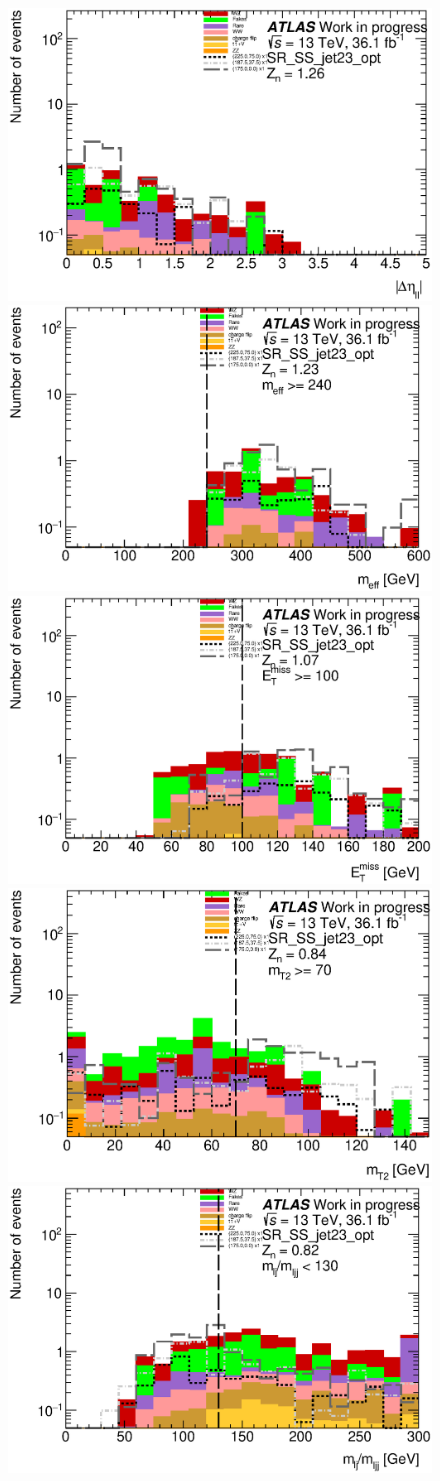 \begin{figure}[htpb]
\centering
\includegraphics[width=0.45\linewidth]{data/plot/plot_SR/dEta_SR_SS_jet23_opt_0}
\includegraphics[width=0.45\linewidth]{data/plot/plot_SR/meff_SR_SS_jet23_opt_0}\\
\includegraphics[width=0.45\linewidth]{data/plot/plot_SR/MET_SR_SS_jet23_opt_0}
\includegraphics[width=0.45\linewidth]{data/plot/plot_SR/mTtwo_SR_SS_jet23_opt_0}\\
\includegraphics[width=0.45\linewidth]{data/plot/plot_SR/mlj_SR_SS_jet23_opt_0}

\end{figure}

